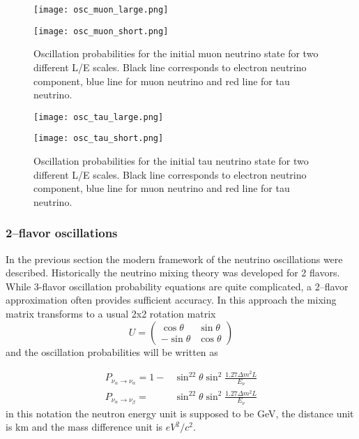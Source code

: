 \documentclass[../main.tex]{subfiles}
\begin{document}
\begin{figure}
\centering
\begin{minipage}{0.4\linewidth}
  \texttt{[image: osc\_muon\_large.png]}
\end{minipage}
\hfill
\begin{minipage}{0.4\linewidth}
  \texttt{[image: osc\_muon\_short.png]}
\end{minipage}
\caption{Oscillation probabilities for the initial muon neutrino state for two different L/E scales. Black line corresponds to electron neutrino component, blue line for muon neutrino and red line for tau neutrino.}
\label{fig:intro:osc2}
\end{figure}

\begin{figure}
\centering
\begin{minipage}{0.4\linewidth}
  \texttt{[image: osc\_tau\_large.png]}
\end{minipage}
\hfill
\begin{minipage}{0.4\linewidth}
  \texttt{[image: osc\_tau\_short.png]}
\end{minipage}
\caption{Oscillation probabilities for the initial tau neutrino state for two different L/E scales. Black line corresponds to electron neutrino component, blue line for muon neutrino and red line for tau neutrino.}
\label{fig:intro:osc3}
\end{figure}


\subsubsection{2--flavor oscillations}
In the previous section the modern framework of the neutrino oscillations were described. Historically the neutrino mixing theory was developed for 2 flavors. While 3-flavor oscillation probability equations are quite complicated, a 2--flavor approximation often provides sufficient accuracy. In this approach the mixing matrix transforms to a usual 2x2 rotation matrix
\begin{equation}
U=
\begin{pmatrix}
\cos\theta    & \sin\theta     \\
-\sin\theta   & \cos\theta
\end{pmatrix}
\end{equation}
and the oscillation probabilities will be written as

\begin{align}
P_{\nu_\alpha\to\nu_\alpha}=1-&\sin^22\theta\sin^2\frac{1.27\Delta m^2L}{E_\nu} \\
P_{\nu_\alpha\to\nu_\beta}=&\sin^22\theta\sin^2\frac{1.27\Delta m^2L}{E_\nu}
\end{align}
in this notation the neutron energy unit is supposed to be GeV, the distance unit is km and the mass difference unit is $eV^2/c^2$.
\end{document}
